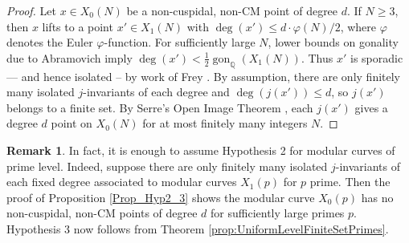 \documentclass{amsart}
\theoremstyle{definition}
\newtheorem{remark}[theorem]{Remark}
\newcommand{\gon}{\operatorname{gon}}
\newcommand{\Q}{\mathbb{Q}}
\begin{document}
\begin{proof}
    Let $x\in X_0(N)$ be a non-cuspidal, non-CM point of degree $d$. If $N \geq 3$, then $x$ lifts to a point $x'\in X_1(N)$ with $\deg(x') \leq d \cdot \varphi(N)/2$, where $\varphi$ denotes the Euler $\varphi$-function. For sufficiently large $N$, lower bounds on gonality due to Abramovich \cite[Theorem 0.1]{abramovich} imply $\deg(x')< \frac{1}{2}\gon_{\Q}(X_1(N))$. Thus $x'$ is sporadic --- and hence isolated -- by work of Frey \cite[Proposition 2]{frey}. By assumption, there are only finitely many isolated $j$-invariants of each degree and $\deg(j(x')) \leq d$, so $j(x')$ belongs to a finite set. By Serre's Open Image Theorem \cite{serre72}, each $j(x')$ gives a degree $d$ point on $X_0(N)$ for at most finitely many integers $N$.
\end{proof}

\begin{remark}
In fact, it is enough to assume Hypothesis 2 for modular curves of prime level.
Indeed, suppose there are only finitely many isolated $j$-invariants of each fixed degree associated to modular curves $X_1(p)$ for $p$ prime. Then the proof of Proposition \ref{Prop_Hyp2_3} shows the modular curve $X_0(p)$ has no non-cuspidal, non-CM points of degree $d$ for sufficiently large primes $p$.  Hypothesis 3 now follows from Theorem \ref{prop:UniformLevelFiniteSetPrimes}.
\end{remark}
\end{document}
